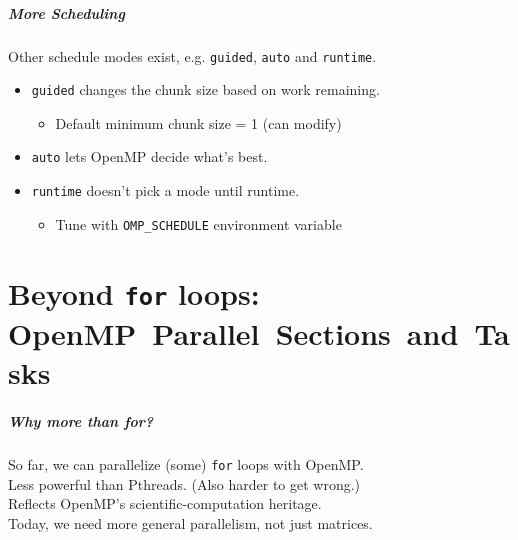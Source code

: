 \documentclass[aspectratio=43]{beamer}
\newenvironment{changemargin}[1]{%
  \begin{list}{}{%
    \setlength{\topsep}{0pt}%
    \setlength{\leftmargin}{#1}%
    \setlength{\rightmargin}{1em}
    \setlength{\listparindent}{\parindent}%
    \setlength{\itemindent}{\parindent}%
    \setlength{\parsep}{\parskip}%
  }%
  \item[]}{\end{list}}
\begin{document}
\begin{frame}[fragile]
  \frametitle{More Scheduling}

  \begin{changemargin}{1cm}
  
  Other schedule modes exist, e.g. {\tt guided}, {\tt auto} and {\tt runtime}.
      
  \begin{itemize}
    \item {\tt guided} changes the chunk size based on work
          remaining.
          
      \begin{itemize}
        \item Default minimum chunk size = 1 (can modify)
      \end{itemize}
    \item {\tt auto} lets OpenMP decide what's best.
    \item {\tt runtime} doesn't pick a mode until runtime.
      \begin{itemize}
        \item Tune with \verb+OMP_SCHEDULE+ environment variable
      \end{itemize}
  \end{itemize}
  \end{changemargin}

\end{frame}

\part{Beyond {\tt for} loops: OpenMP~Parallel~Sections~and~Tasks}
\frame{\partpage}

\begin{frame}[fragile]
  \frametitle{Why more than for?}

\large
  \begin{changemargin}{1cm}
  So far, we can parallelize (some) {\tt for} loops with OpenMP.\\[1em]

  Less powerful than Pthreads. (Also harder to get wrong.)\\[1em]

  Reflects OpenMP's scientific-computation heritage.\\[1em]

  Today, we need more general parallelism, not just matrices.
  \end{changemargin}


\end{frame}
\end{document}
